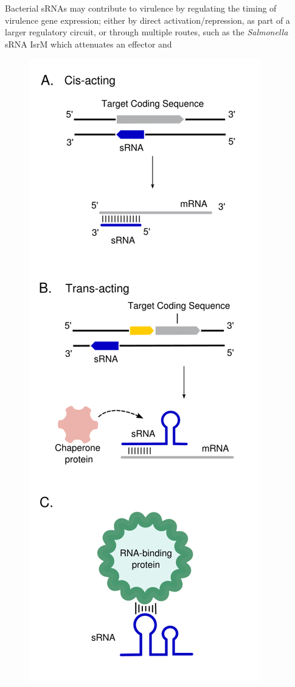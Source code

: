 Bacterial sRNAs may contribute to virulence by regulating the timing of virulence gene expression; either by direct activation/repression, as part of a larger regulatory circuit, or through multiple routes, such as the \textit{Salmonella} sRNA IsrM which attenuates an effector and \begin{figure}
\includegraphics[scale=1.5]{intro/sRNA_cis_trans.png}

\end{figure}
